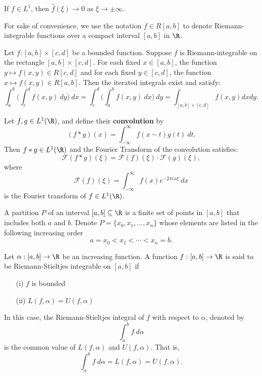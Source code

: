\begin{lemma}\label{Riemann-Lebesgue}
    If \( f \in L^{1} \), then \( \hat{f}(\xi) \to 0 \) as \( \xi \to \pm \infty  \).
\end{lemma}

For sake of convenience, we use the notation \( f \in R[a,b] \) to denote Riemann-integrable functions over a compact interval \( [a,b] \) in \( \R  \).

\begin{theorem}\label{Fubini's Theorem}
    Let \( f: [a,b] \times [c,d]  \) be a bounded function. Suppose \( f  \) is Riemann-integrable on the rectangle \( [a,b] \times [c,d] \). For each fixed \( x \in [a,b]  \), the function \( y \mapsto f(x,y) \in R[c,d] \) and for each fixed \( y \in [c,d] \), the function \( x \mapsto f(x,y) \in R[a,b] \). Then the iterated integrals exist and satisfy: 
    \[  \int_{ a }^{ b }  \Big(  \int_{ c }^{ d }  f(x,y) \ dy  \Big) \ dx = \int_{ c }^{ d } \Big(  \int_{ a }^{ b }  f(x,y) \ dx   \Big) \ dy = \int_{ [a,b] \times [c,d] } f(x,y) dx dy. \]
\end{theorem}

\begin{theorem}\label{Convolution Theorem}
   Let \( f,g \in L^{1}(\R) \), and define their \textbf{convolution} by 
   \[  (f * g)(x) = \int_{ - \infty  }^{  \infty  }  f(x- t)g(t) \ dt.  \]
   Then \( f * g \in L^{1}(\R) \) and the Fourier Transform of the convolution satisfies:
   \[  \mathcal{F}(f * g)(\xi) = \mathcal{F}(f)(\xi) \cdot \mathcal{F}(g)(\xi), \]
   where
   \[  \mathcal{F}(f)(\xi) = \int_{ - \infty  }^{ \infty   }  f(x) e^{-2 \pi i x \xi } \ dx  \]
   is the Fourier transform of \( f \in L^{1}(\R) \).
\end{theorem}


\begin{definition}[Partition]
    A partition \( P \) of an interval \( [a,b] \subseteq \R  \) is a finite set of points in \( [a,b] \) that includes both \( a \) and \( b  \). Denote \( P = \{ {x}_{0}, {x}_{1}, \dots, {x}_{n}  \}  \) whose elements are listed in the following increasing order
    \[  a =  {x}_{0} < {x}_{1} < \cdots < {x}_{n} = b.   \]
\end{definition}


\begin{definition}
    Let \( \alpha: [a,b] \to \R  \) be an increasing function. A function \( f:[a,b] \to \R  \) is said to be Riemann-Stieltjes integrable on \( [a,b] \) if 
    \begin{enumerate}
        \item[(i)] \( f \) is bounded
        \item[(ii)] \( L(f,\alpha) = U(f,\alpha) \)
    \end{enumerate}
    In this case, the Riemann-Stieltjes integral of \( f  \) with respect to \( \alpha \), denoted by
    \[  \int_{ a }^{ b }  f \ d \alpha \]
    is the common value of \( L(f,\alpha) \) and \( U(f,\alpha) \). That is,
    \[ \int_{ a }^{ b }  f  \ d \alpha = L(f,\alpha) = U(f,\alpha). \]
\end{definition}

